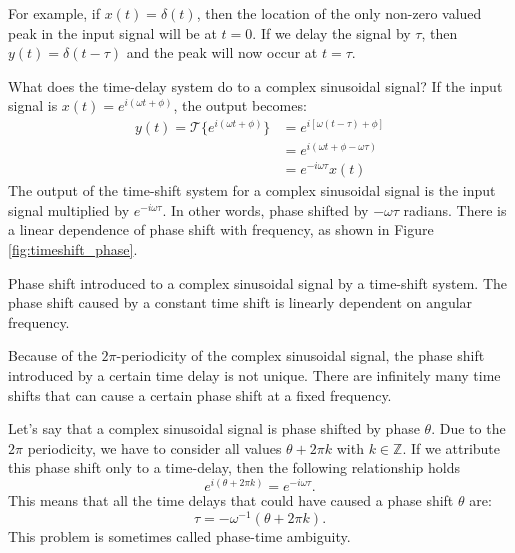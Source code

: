 For example, if $x(t)=\delta(t)$, then the location of the only non-zero valued peak in the input signal will be at $t=0$. If we delay the signal by $\tau$, then $y(t)=\delta(t-\tau)$ and the peak will now occur at $t=\tau$.

What does the time-delay system do to a complex sinusoidal signal? If the input signal is $x(t) = e^{i(\omega t + \phi)}$, the output becomes:
\begin{align}
y(t) = \mathcal{T}\{e^{i(\omega t + \phi)}\} &= e^{i[\omega (t-\tau) + \phi]}\\
&=  e^{i(\omega t + \phi - \omega \tau)}\\
&=  e^{-i\omega \tau}x(t)
\end{align}
The output of the time-shift system for a complex sinusoidal signal is
the input signal multiplied by $e^{-i\omega \tau}$. In other words,
phase shifted by $-\omega \tau$ radians. There is a linear dependence
of phase shift with frequency, as shown in
Figure \ref{fig:timeshift_phase}.

\begin{marginfigure}
\begin{center}
\end{center}
\caption{Phase shift introduced to a complex sinusoidal signal by a time-shift system. The phase shift caused by a constant time shift is linearly dependent on angular frequency.}
\label{fig:timeshift_phase}
\end{marginfigure}

Because of the $2\pi$-periodicity of the complex sinusoidal signal,
the phase shift introduced by a certain time delay is not
unique. There are infinitely many time shifts that can cause a certain
phase shift at a fixed frequency.

Let's say that a complex sinusoidal signal is phase shifted by phase
$\theta$. Due to the $2\pi$ periodicity, we have to consider all
values $\theta + 2\pi k$ with $k\in\mathbb{Z}$. If we attribute this
phase shift only to a time-delay, then the following relationship holds
\begin{equation}
e^{i (\theta+2\pi k)} = e^{-i \omega \tau}.
\end{equation}
This means that all the time delays that could have caused a phase shift $\theta$ are:
\begin{equation}
\tau = -\omega^{-1}(\theta+2\pi k).
\end{equation}
This problem is sometimes called phase-time ambiguity.

